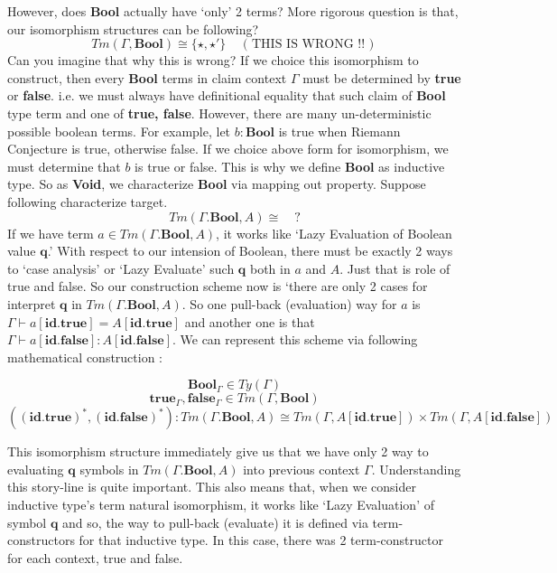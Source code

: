 \documentclass[12pt, a4paper, openany, twoside]{book}
\theoremstyle{definition}
\theoremstyle{remark}
\theoremstyle{plain}
\numberwithin{equation}{section}
\begin{document}
However, does \textbf{Bool} actually have \lq only' 2 terms? More rigorous question is that, our 
isomorphism structures can be following? 
\[Tm(\Gamma, \mathbf{Bool}) \cong \{\star, \star'\} \quad \text{ ( THIS IS WRONG !! ) }\]
Can you imagine that why this is wrong? If we choice this isomorphism to construct, then every 
\textbf{Bool} terms in claim context $\Gamma$ must be determined by \textbf{true} or \textbf{false}. 
i.e. we must always have definitional equality that such claim of \textbf{Bool} type term and one of \textbf{true, false}. 
However, there are many un-deterministic possible boolean terms. For example, let $b : \mathbf{Bool}$ is true when Riemann Conjecture is true, otherwise false. 
If we choice above form for isomorphism, we must determine that $b$ is true or false. This is why we define \textbf{Bool} as inductive type. 
So as \textbf{Void}, we characterize \textbf{Bool} via mapping out property. 
Suppose following characterize target. 
\[Tm(\Gamma.\mathbf{Bool}, A) \cong \quad ?\]
If we have term $a \in Tm(\Gamma.\mathbf{Bool}, A)$, it works like \lq Lazy Evaluation of Boolean value $\mathbf{q}$.'
With respect to our intension of Boolean, there must be exactly 2 ways to \lq case analysis' or \lq Lazy Evaluate' such $\mathbf{q}$ both in $a$ and $A$. 
Just that is role of true and false. So our construction scheme now is \lq there are only 2 cases for interpret $\mathbf{q}$ in $Tm(\Gamma.\mathbf{Bool}, A)$. 
So one pull-back (evaluation) way for $a$ is $\Gamma \vdash a[\mathbf{id.true}] = A[\mathbf{id.true}]$ and another one is that $\Gamma \vdash a[\mathbf{id.false}] : A[\mathbf{id.false}]$. 
We can represent this scheme via following mathematical construction : 

\begin{tcolorbox}[colback=yellow!10!white,colframe=green!75!black,title=Construction 3.3.3.]\hypertarget{const 3.3.3.}{}
    \[\mathbf{Bool}_\Gamma \in Ty(\Gamma)\]
    \[\mathbf{true}_\Gamma, \mathbf{false}_\Gamma \in Tm(\Gamma, \mathbf{Bool})\]
    \[((\mathbf{id.true})^*, (\mathbf{id.false})^*) : Tm(\Gamma.\mathbf{Bool}, A) \cong Tm(\Gamma, A[\mathbf{id.true}]) \times Tm(\Gamma, A[\mathbf{id.false}])\]
\end{tcolorbox}

This isomorphism structure immediately give us that we have only 2 way to evaluating $\mathbf{q}$ symbols in $Tm(\Gamma.\mathbf{Bool}, A)$ into 
previous context $\Gamma$. Understanding this story-line is quite important. 
This also means that, when we consider inductive type's term natural isomorphism, it works like \lq Lazy Evaluation' of symbol $\mathbf{q}$ and so, 
the way to pull-back (evaluate) it is defined via term-constructors for that inductive type. In this case, there was 2 term-constructor for each context, true and false. 
\end{document}
